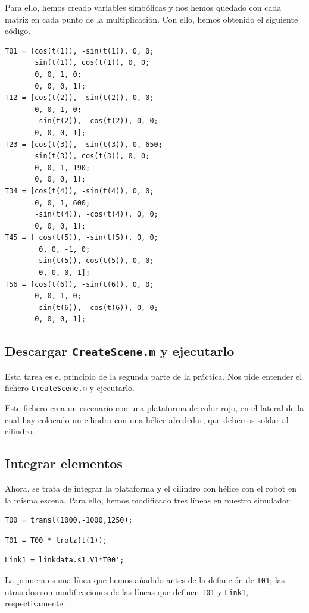 \documentclass{article}
\begin{document}
Para ello, hemos creado variables simbólicas y nos hemos quedado con cada matriz en cada punto de la multiplicación. Con ello, hemos obtenido el siguiente código.
\begin{lstlisting}[frame=single]
T01 = [cos(t(1)), -sin(t(1)), 0, 0;
       sin(t(1)), cos(t(1)), 0, 0; 
       0, 0, 1, 0; 
       0, 0, 0, 1];
T12 = [cos(t(2)), -sin(t(2)), 0, 0;
       0, 0, 1, 0; 
       -sin(t(2)), -cos(t(2)), 0, 0;
       0, 0, 0, 1];
T23 = [cos(t(3)), -sin(t(3)), 0, 650;
       sin(t(3)), cos(t(3)), 0, 0; 
       0, 0, 1, 190;
       0, 0, 0, 1];
T34 = [cos(t(4)), -sin(t(4)), 0, 0;
       0, 0, 1, 600;
       -sin(t(4)), -cos(t(4)), 0, 0;
       0, 0, 0, 1];
T45 = [ cos(t(5)), -sin(t(5)), 0, 0;
        0, 0, -1, 0;
        sin(t(5)), cos(t(5)), 0, 0;
        0, 0, 0, 1];
T56 = [cos(t(6)), -sin(t(6)), 0, 0;
       0, 0, 1, 0;
       -sin(t(6)), -cos(t(6)), 0, 0;
       0, 0, 0, 1];
\end{lstlisting}

\subsection{Descargar {\tt CreateScene.m} y ejecutarlo}
Esta tarea es el principio de la segunda parte de la práctica. Nos pide entender el fichero {\tt CreateScene.m} y ejecutarlo.

Este fichero crea un escenario con una plataforma de color rojo, en el lateral de la cual hay colocado un cilindro con una hélice alrededor, que debemos soldar al cilindro.

\subsection{Integrar elementos}
Ahora, se trata de integrar la plataforma y el cilindro con hélice con el robot en la misma escena. Para ello, hemos modificado tres líneas en nuestro simulador:
\begin{lstlisting}[frame=single]
T00 = transl(1000,-1000,1250);
\end{lstlisting}

\begin{lstlisting}[frame=single]
T01 = T00 * trotz(t(1));
\end{lstlisting}

\begin{lstlisting}[frame=single]
Link1 = linkdata.s1.V1*T00';
\end{lstlisting}

La primera es una línea que hemos añadido antes de la definición de {\tt T01}; las otras dos son modificaciones de las líneas que definen {\tt T01} y {\tt Link1}, respectivamente.
\end{document}
